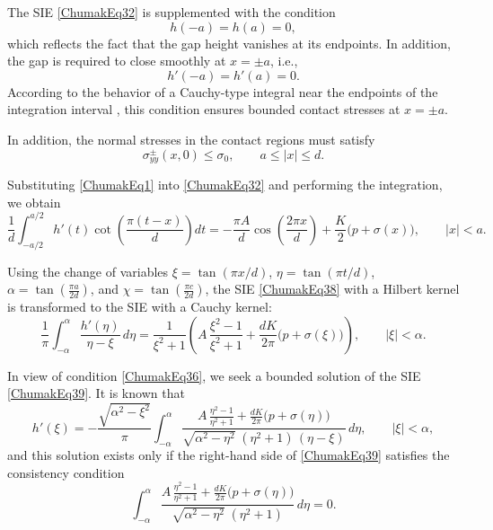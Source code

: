 The SIE \eqref{ChumakEq32} is supplemented with the condition
\begin{equation}
	\label{ChumakEq35}
	h(-a)=h(a)=0,
\end{equation}
which reflects the fact that the gap height vanishes at its endpoints. In addition, the gap is required to close smoothly at $x=\pm a$, i.e.,
\begin{equation}
	\label{ChumakEq36}
	h'(-a)=h'(a)=0.
\end{equation}
According to the behavior of a Cauchy-type integral near the endpoints of the integration interval \cite{Chumak34}, this condition ensures bounded contact stresses at $x=\pm a$.

In addition, the normal stresses in the contact regions must satisfy
\begin{equation}
	\label{ChumakEq37}
	\sigma_{yy}^{\pm}(x,0) \le \sigma_{0},
	\qquad a \le |x| \le d.
\end{equation}

Substituting \eqref{ChumakEq1} into \eqref{ChumakEq32} and performing the integration, we obtain
\begin{equation}
	\label{ChumakEq38}
	\frac{1}{d}
	\int_{-a/2}^{a/2}
	h'(t)
	\cot\!\left(
	\frac{\pi (t-x)}{d}
	\right)
	dt
	=
	-
	\frac{\pi A}{d}
	\cos\!\left(
	\frac{2\pi x}{d}
	\right)
	+
	\frac{K}{2}\bigl(p + \sigma(x)\bigr),
	\qquad |x| < a.
\end{equation}

Using the change of variables $\xi=\tan(\pi x/d)$, $\eta=\tan(\pi t/d)$, $\alpha=\tan\!\left(\tfrac{\pi a}{2d}\right)$, and $\chi=\tan\!\left(\tfrac{\pi c}{2d}\right)$, the SIE \eqref{ChumakEq38} with a Hilbert kernel is transformed to the SIE with a Cauchy kernel:
\begin{equation}
	\label{ChumakEq39}
	\frac{1}{\pi}\int_{-\alpha}^{\alpha}\frac{h'(\eta)}{\eta-\xi}\,d\eta
	=
	\frac{1}{\xi^{2}+1}\left(
	A\,\frac{\xi^{2}-1}{\xi^{2}+1}
	+
	\frac{dK}{2\pi}\bigl(p+\sigma(\xi)\bigr)
	\right),
	\qquad |\xi|<\alpha .
\end{equation}

In view of condition \eqref{ChumakEq36}, we seek a bounded solution of the SIE \eqref{ChumakEq39}. It is known \cite{Chumak34} that
\begin{equation}
	\label{ChumakEq40}
	h'(\xi)
	=
	-\frac{\sqrt{\alpha^{2}-\xi^{2}}}{\pi}
	\int_{-\alpha}^{\alpha}
	\frac{
		A\,\frac{\eta^{2}-1}{\eta^{2}+1}
		+
		\frac{dK}{2\pi}\bigl(p+\sigma(\eta)\bigr)
	}{
		\sqrt{\alpha^{2}-\eta^{2}}\;(\eta^{2}+1)\,(\eta-\xi)
	}\,d\eta,
	\qquad |\xi|<\alpha ,
\end{equation}
and this solution exists only if the right-hand side of \eqref{ChumakEq39} satisfies the consistency condition \cite{Chumak34}
\begin{equation}
	\label{ChumakEq41}
	\int_{-\alpha}^{\alpha}
	\frac{
		A\,\frac{\eta^{2}-1}{\eta^{2}+1}
		+
		\frac{dK}{2\pi}\bigl(p+\sigma(\eta)\bigr)
	}{
		\sqrt{\alpha^{2}-\eta^{2}}\;(\eta^{2}+1)
	}\,d\eta
	=0 .
\end{equation}

